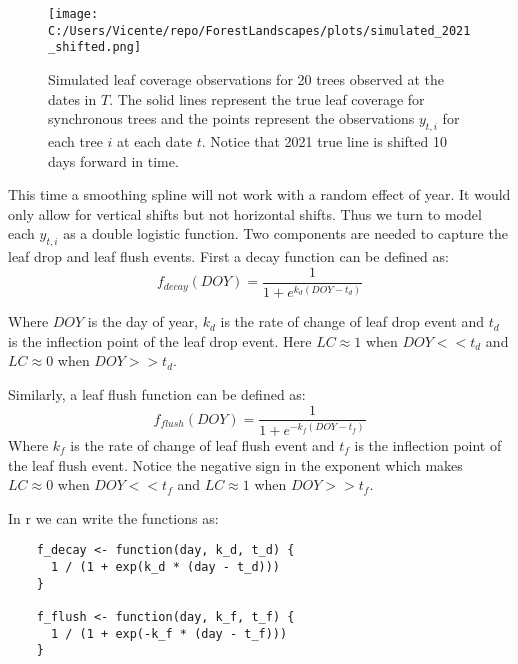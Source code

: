 \documentclass{article}
\begin{document}
\begin{figure}
    \centering
    \texttt{[image: C:/Users/Vicente/repo/ForestLandscapes/plots/simulated\_2021\_shifted.png]}
    \caption{Simulated leaf coverage observations for 20 trees observed at the dates in $T$. The solid lines represent the true leaf coverage for synchronous trees and the points represent the observations $y_{t, i}$ for each tree $i$ at each date $t$. Notice that 2021 true line is shifted 10 days forward in time.}
    \label{fig:interpolation_problem_asynchronous}
\end{figure}

This time a smoothing spline will not work with a random effect of year. 
It would only allow for vertical shifts but not horizontal shifts.
Thus we turn to model each $y_{t, i}$ as a double logistic function.
Two components are needed to capture the leaf drop and leaf flush events.
First a decay function can be defined as:
\begin{equation}
    f_{decay}(DOY)= \frac{1}{1 + e^{k_{d}(DOY - t_{d})}}
\end{equation}

Where $DOY$ is the day of year, $k_{d}$ is the rate of change of leaf drop event and $t_{d}$ is the inflection point of the leaf drop event.
Here $LC \approx 1$ when $DOY << t_{d}$ and $LC \approx 0$ when $DOY >> t_{d}$.

Similarly, a leaf flush function can be defined as:
\begin{equation}
    f_{flush}(DOY)= \frac{1}{1 + e^{-k_{f}(DOY - t_{f})}}
\end{equation}
Where $k_{f}$ is the rate of change of leaf flush event and $t_{f}$ is the inflection point of the leaf flush event.
Notice the negative sign in the exponent which makes $LC \approx 0$ when $DOY << t_{f}$ and $LC \approx 1$ when $DOY >> t_{f}$.


In r we can write the functions as:

\begin{verbatim}
    f_decay <- function(day, k_d, t_d) {
      1 / (1 + exp(k_d * (day - t_d)))
    }

    f_flush <- function(day, k_f, t_f) {
      1 / (1 + exp(-k_f * (day - t_f)))
    }
\end{verbatim}
\end{document}
